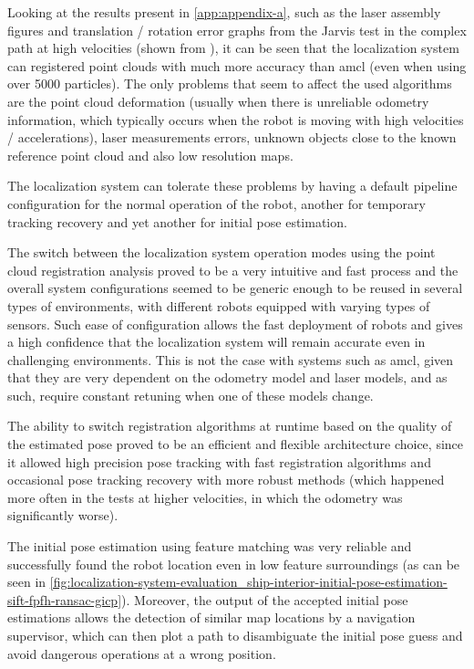 Looking at the results present in \cref{app:appendix-a}, such as the laser assembly figures and translation / rotation error graphs from the Jarvis test in the complex path at high velocities (shown from ), it can be seen that the localization system can registered point clouds with much more accuracy than \gls{amcl} (even when using over 5000 particles). The only problems that seem to affect the used algorithms are the point cloud deformation (usually when there is unreliable odometry information, which typically occurs when the robot is moving with high velocities / accelerations), laser measurements errors, unknown objects close to the known reference point cloud and also low resolution maps.

The localization system can tolerate these problems by having a default pipeline configuration for the normal operation of the robot, another for temporary tracking recovery and yet another for initial pose estimation.

The switch between the localization system operation modes using the point cloud registration analysis proved to be a very intuitive and fast process and the overall system configurations seemed to be generic enough to be reused in several types of environments, with different robots equipped with varying types of sensors. Such ease of configuration allows the fast deployment of robots and gives a high confidence that the localization system will remain accurate even in challenging environments. This is not the case with systems such as \gls{amcl}, given that they are very dependent on the odometry model and laser models, and as such, require constant retuning when one of these models change.

The ability to switch registration algorithms at runtime based on the quality of the estimated pose proved to be an efficient and flexible architecture choice, since it allowed high precision pose tracking with fast registration algorithms and occasional pose tracking recovery with more robust methods (which happened more often in the tests at higher velocities, in which the odometry was significantly worse).

The initial pose estimation using feature matching was very reliable and successfully found the robot location even in low feature surroundings (as can be seen in \cref{fig:localization-system-evaluation_ship-interior-initial-pose-estimation-sift-fpfh-ransac-gicp}). Moreover, the output of the accepted initial pose estimations allows the detection of similar map locations by a navigation supervisor, which can then plot a path to disambiguate the initial pose guess and avoid dangerous operations at a wrong position.

